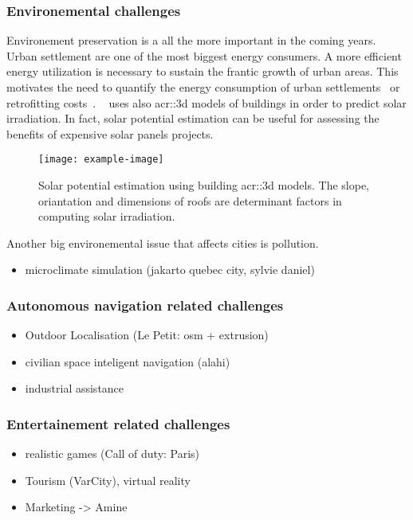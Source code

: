         \subsubsection{Environemental challenges}
        Environement preservation is a all the more important in the coming years.
        Urban settlement are one of the most biggest energy consumers.
        A more efficient energy utilization is necessary to sustain the frantic growth of urban areas.
        This motivates the need to quantify the energy consumption of urban settlements~\parencite{WATE20153372} or retrofitting costs~\parencite{previtali2014automatic}.
        ~\textcite{biljecki2015propagation} uses also \gls{acr::3d} models of buildings in order to predict solar irradiation.
        In fact, solar potential estimation can be useful for assessing the benefits of expensive solar panels projects.\\
        \begin{figure}[h]
            \centering
            \texttt{[image: example-image]}             
            \caption{
                \label{fig::solar_potential} Solar potential estimation using building \gls{acr::3d} models.
                The slope, oriantation and dimensions of roofs are determinant factors in computing solar irradiation.
            }
        \end{figure}
        Another big environemental issue that affects cities is pollution.
        \begin{itemize}
            \item microclimate simulation (jakarto quebec city, sylvie daniel)
        \end{itemize}
        \subsubsection{Autonomous navigation related challenges}
        \begin{itemize}
            \item Outdoor Localisation (Le Petit: osm + extrusion)
            \item civilian space inteligent navigation (alahi)
            \item industrial assistance
        \end{itemize}
        \subsubsection{Entertainement related challenges}
        \begin{itemize}
            \item realistic games (Call of duty: Paris)
            \item Tourism (VarCity), virtual reality
            \item Marketing -> Amine
        \end{itemize}
